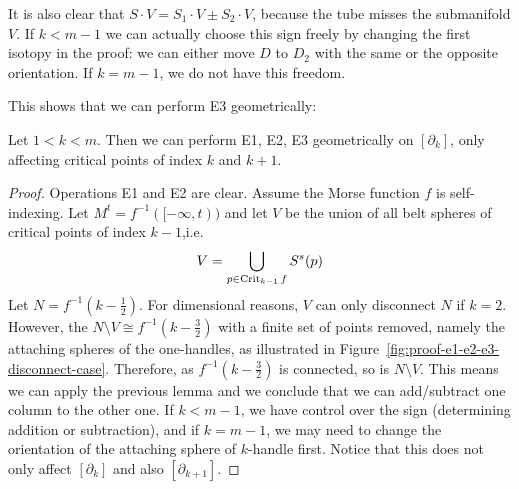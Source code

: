 \begin{remark}
    It is also clear that $S\cdot V = S_1\cdot V \pm S_2 \cdot V$, because the tube misses the submanifold $V$.
    If $k < m-1$ we can actually choose this sign freely by changing the first isotopy in the proof: we can either move $D$ to $ D_2$ with the same or the opposite orientation. If $k = m-1$, we do not have this freedom.
\end{remark}

This shows that we can perform E3 geometrically:
\begin{theorem}
    Let $1 < k < m$. Then we can perform E1, E2, E3 geometrically on $[\partial_k]$, only affecting critical points of index $k$ and $k+1$.
\end{theorem}
\begin{proof}
    Operations E1 and E2 are clear.
    Assume the Morse function $f$ is self-indexing.
    Let  $M^{t} = f^{-1}([-\infty, t))$ and let $V$ be the union of all belt spheres of critical points of index $k-1$,i.e. \[
        V = \bigcup_{p \in \operatorname{Crit}_{k-1} f} S^{s}(p)
    \]
    Let $N = f^{-1}(k - \frac{1}{2})$.
    For dimensional reasons, $V$ can only disconnect $N$ if  $k = 2$.
    However, the $N \setminus V \cong f^{-1}(k - \frac{3}{2})$ with a finite set of points removed, namely the attaching spheres of the one-handles, as illustrated in Figure~\ref{fig:proof-e1-e2-e3-disconnect-case}.
    Therefore, as $f^{-1}(k- \frac{3}{2})$ is connected, so is $N \setminus V$.
    This means we can apply the previous lemma and we conclude that we can add/subtract one column to the other one.
    If $k < m-1$, we have control over the sign (determining addition or subtraction), and if $k = m-1$, we may need to change the orientation of the attaching sphere of  $k$-handle first.
    Notice that this does not only affect $[\partial_k]$ and also  $[\partial_{k+1}]$.
\end{proof}

